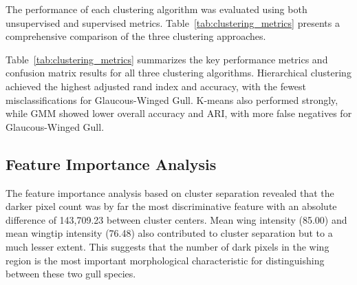 \documentclass[a4paper,12pt]{report}
\begin{document}
The performance of each clustering algorithm was evaluated using both unsupervised and supervised metrics. Table~\ref{tab:clustering_metrics} presents a comprehensive comparison of the three clustering approaches.

\begin{table}[H]
    \centering
    \caption{Performance and confusion matrix summary for clustering algorithms. TP = True Positives, FN = False Negatives, GWG = Glaucous-Winged Gull, SBG = Slaty-Backed Gull.}
    \label{tab:clustering_metrics}
\end{table}

    Table~\ref{tab:clustering_metrics} summarizes the key performance metrics and confusion matrix results for all three clustering algorithms. Hierarchical clustering achieved the highest adjusted rand index and accuracy, with the fewest misclassifications for Glaucous-Winged Gull. K-means also performed strongly, while GMM showed lower overall accuracy and ARI, with more false negatives for Glaucous-Winged Gull.
 
\subsection{Feature Importance Analysis}

The feature importance analysis based on cluster separation revealed that the darker pixel count was by far the most discriminative feature with an absolute difference of 143,709.23 between cluster centers. Mean wing intensity (85.00) and mean wingtip intensity (76.48) also contributed to cluster separation but to a much lesser extent. This suggests that the number of dark pixels in the wing region is the most important morphological characteristic for distinguishing between these two gull species.
\end{document}
